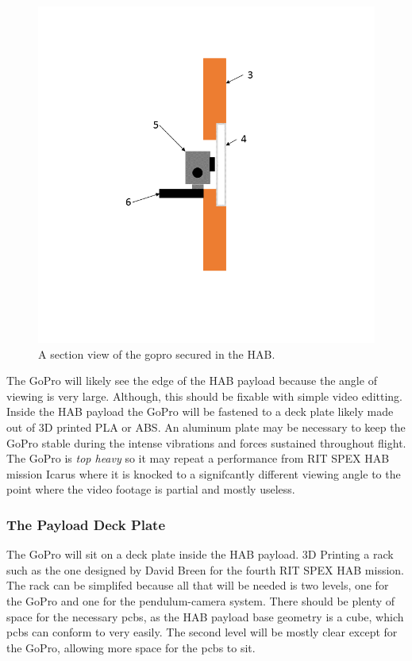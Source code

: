 \documentclass[journal]{SPEXformat}
\begin{document}
\begin{figure}
  \includegraphics[width = \linewidth]{figs/GoPro-Fig.png}
  \caption{A section view of the gopro secured in the HAB.}
  \label{fig: GoPro Section View}
\end{figure}

  The GoPro will likely see the edge of the HAB payload because the angle of viewing is very large. Although, this should
  be fixable with simple video editting. Inside the HAB payload the GoPro will be fastened to a deck plate likely made out
  of 3D printed PLA or ABS. An aluminum plate may be necessary to keep the GoPro stable during the intense vibrations
  and forces sustained throughout flight. The GoPro is \textit{top heavy} so it may repeat a performance from RIT SPEX HAB
  mission Icarus where it is knocked to a signifcantly different viewing angle to the point where the video footage is
  partial and mostly useless.
\subsubsection{The Payload Deck Plate}
\label{subsubsec: the payload deck plate}

  The GoPro will sit on a deck plate inside the HAB payload. 3D Printing a rack such as the one designed by David Breen
  for the fourth RIT SPEX HAB mission. The rack can be simplifed because all that will be needed is two levels, one for the
  GoPro and one for the pendulum-camera system. There should be plenty of space for the necessary pcbs, as the HAB payload
  base geometry is a cube, which pcbs can conform to very easily. The second level will be mostly clear except for the
  GoPro, allowing more space for the pcbs to sit.
\end{document}
